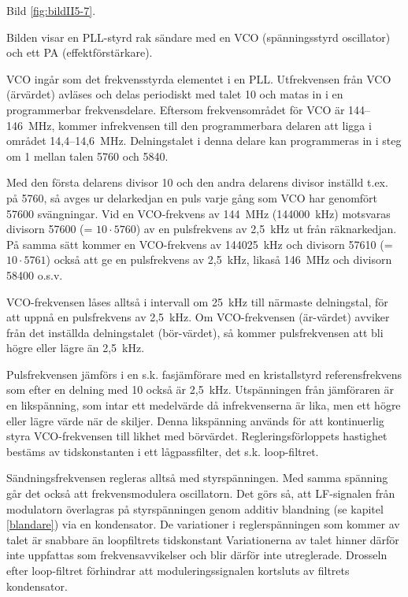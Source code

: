 Bild \ref{fig:bildII5-7}.

Bilden visar en PLL-styrd rak sändare med en VCO (spänningsstyrd
oscillator) och ett PA (effektförstärkare).

VCO ingår som det frekvensstyrda elementet i en PLL. Utfrekvensen från
VCO (ärvärdet) avläses och delas periodiskt med talet 10 och matas in
i en programmerbar frekvensdelare. Eftersom frekvensområdet för VCO är
144--146~MHz, kommer infrekvensen till den programmerbara delaren att
ligga i området 14,4--14,6~MHz. Delningstalet i denna delare kan
programmeras in i steg om 1 mellan talen 5760 och 5840.

Med den första delarens divisor 10 och den andra delarens divisor
inställd t.ex. på 5760, så avges ur delarkedjan en puls varje gång som
VCO har genomfört 57600 svängningar. Vid en VCO-frekvens av 144~MHz
(144000~kHz) motsvaras divisorn 57600 (= \(10 \cdot 5760\)) av en
pulsfrekvens av 2,5~kHz ut från räknarkedjan. På samma sätt kommer en
VCO-frekvens av 144025~kHz och divisorn 57610 (= \(10 \cdot 5761\))
också att ge en pulsfrekvens av 2,5~kHz, likaså 146~MHz och divisorn
58400 o.s.v.

VCO-frekvensen låses alltså i intervall om 25~kHz till närmaste
delningstal, för att uppnå en pulsfrekvens av 2,5~kHz. Om
VCO-frekvensen (är-värdet) avviker från det inställda delningstalet
(bör-värdet), så kommer pulsfrekvensen att bli högre eller lägre än
2,5~kHz.

Pulsfrekvensen jämförs i en s.k. fasjämförare med en kristallstyrd
referensfrekvens som efter en delning med 10 också är 2,5~kHz.
Utspänningen från jämföraren är en likspänning, som intar ett
medelvärde då infrekvenserna är lika, men ett högre eller lägre värde
när de skiljer. Denna likspänning används för att kontinuerlig styra
VCO-frekvensen till likhet med börvärdet. Regleringsförloppets
hastighet bestäms av tidskonstanten i ett lågpassfilter, det
s.k. loop-filtret.

Sändningsfrekvensen regleras alltså med styrspänningen. Med samma
spänning går det också att frekvensmodulera oscillatorn.  Det görs så,
att LF-signalen från modulatorn överlagras på styrspänningen genom
additiv blandning (se kapitel \ref{blandare}) via en kondensator. De
variationer i reglerspänningen som kommer av talet är snabbare än
loopfiltrets tidskonstant Variationerna av talet hinner därför inte
uppfattas som frekvensavvikelser och blir därför inte utreglerade.
Drosseln efter loop-filtret förhindrar att moduleringssignalen
kortsluts av filtrets kondensator.


